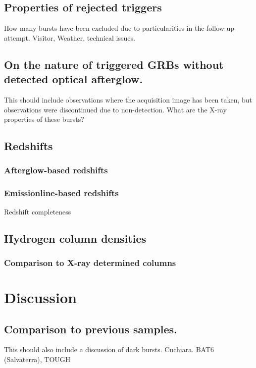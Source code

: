 \documentclass[iop, twocolappendix, numberedappendix, tighten, appendixfloats]{emulateapj}
\begin{document}
	\subsection{Properties of rejected triggers}
	How many bursts have been excluded due to particularities in the follow-up attempt. Visitor, Weather, technical issues.  	
	
	\subsection{On the nature of triggered GRBs without detected optical afterglow.}
	This should include observations where the acquisition image has been taken, but observations were discontinued due to non-detection. What are the X-ray properties of these bursts?
	
	
	\subsection{Redshifts}
	
	\subsubsection{Afterglow-based redshifts}
	
	\subsubsection{Emissionline-based redshifts}	
	Redshift completeness
	
	\subsection{Hydrogen column densities}
	
	\subsubsection{Comparison to X-ray determined columns}	

	
	\section{Discussion}
	
	\subsection{Comparison to previous samples.}	
	This should also include a discussion of dark bursts. 
	Cuchiara. BAT6 (Salvaterra), TOUGH
	
\end{document}
